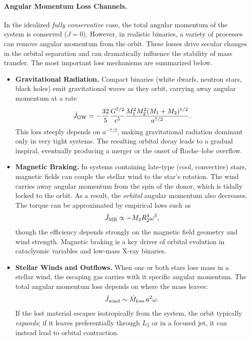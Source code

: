 \medskip
\paragraph{Angular Momentum Loss Channels.}
In the idealized \emph{fully conservative} case, the total angular momentum of the system is conserved ($\dot{J}=0$).  
However, in realistic binaries, a variety of processes can remove angular momentum from the orbit.  
These losses drive secular changes in the orbital separation and can dramatically influence the stability of mass transfer.  
The most important loss mechanisms are summarized below.

\begin{itemize}
    \item \textbf{Gravitational Radiation.}  
    Compact binaries (white dwarfs, neutron stars, black holes) emit gravitational waves as they orbit, carrying away angular momentum at a rate
    \[
    \dot{J}_{\rm GW} = -\frac{32}{5}\frac{G^{7/2}}{c^5}
        \frac{M_1^2 M_2^2 (M_1 + M_2)^{1/2}}{a^{7/2}}.
    \]
    This loss steeply depends on $a^{-7/2}$, making gravitational radiation dominant only in very tight systems.  
    The resulting orbital decay leads to a gradual inspiral, eventually producing a merger or the onset of Roche–lobe overflow.

    \item \textbf{Magnetic Braking.}  
    In systems containing late-type (cool, convective) stars, magnetic fields can couple the stellar wind to the star’s rotation.  
    The wind carries away angular momentum from the spin of the donor, which is tidally locked to the orbit.  
    As a result, the \emph{orbital} angular momentum also decreases.  
    The torque can be approximated by empirical laws such as
    \[
    \dot{J}_{\rm MB} \propto - M_2 R_2^{4} \omega^{3},
    \]
    though the efficiency depends strongly on the magnetic field geometry and wind strength.  
    Magnetic braking is a key driver of orbital evolution in cataclysmic variables and low-mass X-ray binaries.

    \item \textbf{Stellar Winds and Outflows.}  
    When one or both stars lose mass in a stellar wind, the escaping gas carries with it specific angular momentum.  
    The total angular momentum loss depends on where the mass leaves:
    \[
    \dot{J}_{\rm wind} \sim \dot{M}_{\rm loss}\, a^2 \omega.
    \]
    If the lost material escapes isotropically from the system, the orbit typically \emph{expands}; if it leaves preferentially through $L_2$ or in a focused jet, it can instead lead to orbital contraction.


\end{itemize}
